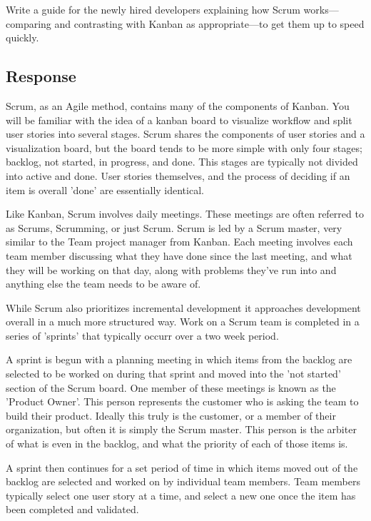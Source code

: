 \documentclass{article}
\begin{document}
  Write a guide for the newly hired developers explaining how Scrum works—comparing
  and contrasting with Kanban as appropriate—to get them up to speed quickly.
  \subsection{Response}
  Scrum, as an Agile method, contains many of the components of Kanban.
  You will be familiar with the idea of a kanban board to visualize workflow and split user stories into several stages.
  Scrum shares the components of user stories and a visualization board,
  but the board tends to be more simple with only
  four stages; backlog, not started, in progress, and done. This stages are typically
  not divided into active and done. User stories themselves, and the process of deciding
  if an item is overall 'done' are essentially identical.

  Like Kanban, Scrum involves daily meetings. These meetings are often referred to as
  Scrums, Scrumming, or just Scrum. Scrum is led by a Scrum master, very similar to
  the Team project manager from Kanban. Each meeting involves each team member discussing
  what they have done since the last meeting, and what they will be working on that day,
  along with problems they've run into and anything else the team needs to be aware of.

  While Scrum also prioritizes incremental development it approaches development overall
  in a much more structured way. Work on a Scrum team is completed in a series of 'sprints'
  that typically occurr over a two week period.

  A sprint is begun with a planning meeting in which items from the backlog are selected to be worked on during that sprint and moved
  into the 'not started' section of the Scrum board. One member of these meetings is known as the 'Product Owner'.
  This person represents the customer who is asking the team to build their product.
  Ideally this truly is the customer, or a member of their organization,
  but often it is simply the Scrum master. This person is the arbiter of what is even in the backlog,
  and what the priority of each of those items is.

  A sprint then continues for a set period of time in which items moved out of the backlog
  are selected and worked on by individual team members. Team members typically select one user story
  at a time, and select a new one once the item has been completed and validated.
\end{document}
